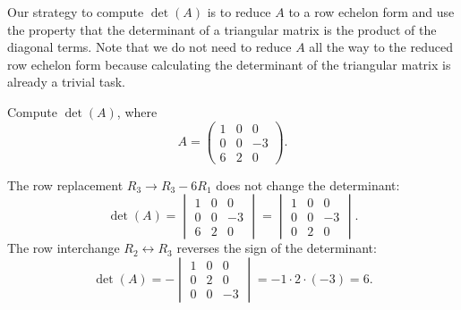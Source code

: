 \documentclass{ximera}
\begin{document}
Our strategy to compute $\det(A)$ is to reduce $A$ to a row echelon
form and use the property that the determinant of a triangular matrix
is the product of the diagonal terms. Note that we do not need to
reduce $A$ all the way to the reduced row echelon form because
calculating the determinant of the triangular matrix is already
a trivial task.

\begin{example}
  Compute $\det(A)$, where
  \[
    A =
    \begin{pmatrix}
      1 & 0 & 0 \\
      0 & 0 & -3 \\
      6 & 2 & 0
    \end{pmatrix}.
  \]
  \begin{explanation}
    The row replacement $R_3 \to R_3 - 6R_1$ does not change the
    determinant:
    \[
      \det(A) =
      \begin{vmatrix}
        1 & 0 & 0 \\
        0 & 0 & -3 \\
        6 & 2 & 0
      \end{vmatrix}
      =
      \begin{vmatrix}
        1 & 0 & 0 \\
        0 & 0 & -3 \\
        0 & 2 & 0
      \end{vmatrix}.
    \]
    The row interchange $R_2 \leftrightarrow R_3$ reverses the sign of the
    determinant:
    \[
      \det(A) = -
      \begin{vmatrix}
        1 & 0 & 0 \\
        0 & 2 & 0 \\
        0 & 0 & -3
      \end{vmatrix}
      = - 1 \cdot 2 \cdot (-3) = 6.
    \]
  \end{explanation}
\end{example}
\end{document}
